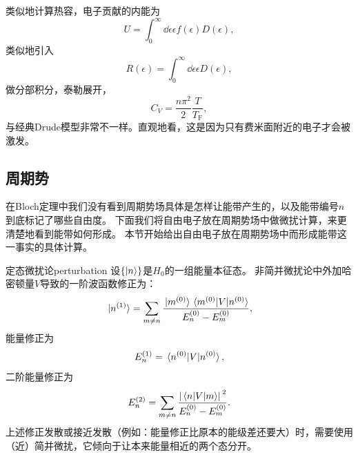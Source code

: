 类似地计算热容，电子贡献的内能为
\[
    U = \int_0^\infty \dd{\epsilon} \epsilon f(\epsilon) D(\epsilon),
\]
类似地引入
\[
    R(\epsilon) = \int_0^\infty \dd{\epsilon} \epsilon D(\epsilon),
\]
做分部积分，泰勒展开，
\begin{equation}
    C_V = \frac{n \pi^2}{2} \frac{T}{T_\text{F}},
    \label{eq:free-electron-special-heat}
\end{equation}
与经典Drude模型非常不一样。直观地看，这是因为只有费米面附近的电子才会被激发。

\subsection{周期势}\label{sec:periodic-potential-electron}

在Bloch定理中我们没有看到周期势场具体是怎样让能带产生的，以及能带编号$n$到底标记了哪些自由度。
下面我们将自由电子放在周期势场中做微扰计算，来更清楚地看到能带如何形成。
本节开始给出自由电子放在周期势场中而形成能带这一事实的具体计算。

\begin{back}{定态微扰论}{perturbation}
    设$\{\ket{n}\}$是$H_0$的一组能量本征态。
    非简并微扰论中外加哈密顿量$V$导致的一阶波函数修正为：
    \[
        \ket*{n^{(1)}} = \sum_{m \neq n} \frac{\ket*{m^{(0)}} \mel*{m^{(0)}}{V}{n^{(0)}}}{E_n^{(0)} - E_m^{(0)}},
    \]
    能量修正为
    \[
        E^{(1)}_n = \mel*{n^{(0)}}{V}{n^{(0)}},
    \]
    二阶能量修正为
    \[
        E^{(2)}_n = \sum_{m \neq n} \frac{\abs*{\mel*{n}{V}{m}}^2}{E_n^{(0)} - E_m^{(0)}}.
    \]
    上述修正发散或接近发散（例如：能量修正比原本的能级差还要大）时，需要使用（近）简并微扰，它倾向于让本来能量相近的两个态分开。
\end{back}

